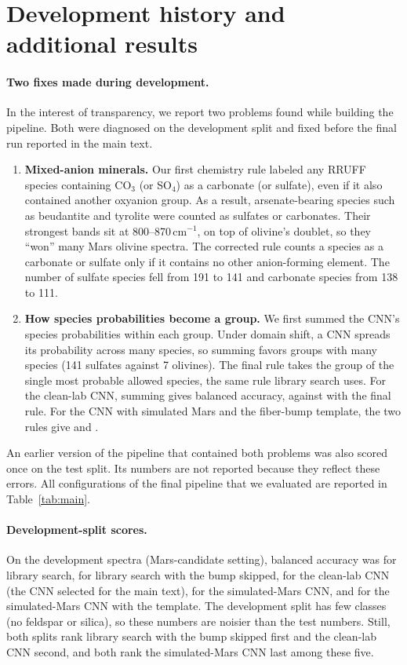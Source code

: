 \appendix
\section{Development history and additional results}
\label{app:history}

\paragraph{Two fixes made during development.} In the interest of transparency, we report two problems found while building the pipeline. Both were diagnosed on the development split and fixed before the final run reported in the main text.
\begin{enumerate}
\item \textbf{Mixed-anion minerals.} Our first chemistry rule labeled any RRUFF species containing CO$_3$ (or SO$_4$) as a carbonate (or sulfate), even if it also contained another oxyanion group. As a result, arsenate-bearing species such as beudantite and tyrolite were counted as sulfates or carbonates. Their strongest bands sit at 800--870\,cm$^{-1}$, on top of olivine's doublet, so they ``won'' many Mars olivine spectra. The corrected rule counts a species as a carbonate or sulfate only if it contains no other anion-forming element. The number of sulfate species fell from 191 to 141 and carbonate species from 138 to 111.
\item \textbf{How species probabilities become a group.} We first summed the CNN's species probabilities within each group. Under domain shift, a CNN spreads its probability across many species, so summing favors groups with many species (141 sulfates against 7 olivines). The final rule takes the group of the single most probable allowed species, the same rule library search uses. For the clean-lab CNN, summing gives \sumBalCnnCleanMars{} balanced accuracy, against \balCnnCleanMars{} with the final rule. For the CNN with simulated Mars and the fiber-bump template, the two rules give \sumBalCnnMarsifiedArtifactMars{} and \balCnnMarsifiedArtifactMars{}.
\end{enumerate}
An earlier version of the pipeline that contained both problems was also scored once on the test split. Its numbers are not reported because they reflect these errors. All configurations of the final pipeline that we evaluated are reported in Table~\ref{tab:main}.

\paragraph{Development-split scores.} On the \nDevEval{} development spectra (Mars-candidate setting), balanced accuracy was \devCosine{} for library search, \devCosineWindow{} for library search with the bump skipped, \devCnnClean{} for the clean-lab CNN (the CNN selected for the main text), \devCnnMarsified{} for the simulated-Mars CNN, and \devCnnMarsifiedArtifact{} for the simulated-Mars CNN with the template. The development split has few classes (no feldspar or silica), so these numbers are noisier than the test numbers. Still, both splits rank library search with the bump skipped first and the clean-lab CNN second, and both rank the simulated-Mars CNN last among these five.
